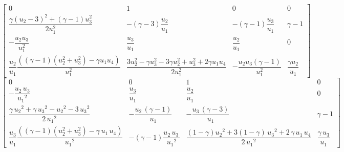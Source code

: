 \documentclass{article}
\numberwithin{equation}{subsection}    %
\begin{document}
\begin{appendix}
    \begin{equation}
        \begin{bmatrix}
            0                                                                                                & 1                                                                                                   & 0                                         & 0                           \\
            \dfrac{\gamma (u_{2}-3)^{2}+(\gamma-1) u_{3}^{2}}{2 u_{1}^{2}}                                   & -(\gamma-3)\dfrac{u_{2}}{u_{1}}                                                                     & -(\gamma-1)\dfrac{u_{3}}{u_{1}}           & \gamma-1                    \\
            -\dfrac{u_{2} u_{3}}{u_{1}^{2}}                                                                  & \dfrac{u_{3}}{u_{1}}                                                                                & \dfrac{u_{2}}{u_{1}}                      & 0                           \\
            \dfrac{u_{2}}{u_1}\dfrac{\left((\gamma-1)(u_{2}^{2}+u_3^2)-\gamma u_{1} u_{4}\right)}{u_{1}^{2}} & \dfrac{3 u_{2}^{2}-\gamma u_{3}^{2}-3 \gamma u_{2}^{2}+u_{3}^{2}+2 \gamma u_{1} u_{4}}{2 u_{1}^{2}} & -\dfrac{u_{2} u_{3}(\gamma-1)}{u_{1}^{2}} & \dfrac{\gamma u_{2}}{u_{1}}
        \end{bmatrix}
    \end{equation}
    \begin{equation}
        \begin{bmatrix}
            0                                                                                             & 0                                                        & 1                                                                                       & 0                           \\
            -\dfrac{u_2 \,u_3 }{{u_1 }^2 }                                                                & \dfrac{u_3 }{u_1 }                                       & \dfrac{u_2 }{u_1 }                                                                      & 0                           \\
            \dfrac{\gamma \,{u_2 }^2 +\gamma \,{u_3 }^2 -{u_2 }^2 -3\,{u_3 }^2 }{2\,{u_1 }^2 }            & -\dfrac{u_2 \,{\left(\gamma -1\right)}}{u_1 }            & -\dfrac{u_3 \,{\left(\gamma -3\right)}}{u_1 }                                           & \gamma -1                   \\
            \dfrac{u_3}{u_1}\dfrac{{\left((\gamma-1)(u_2^2+u_3^2)-\gamma \,u_1 \,u_4 \right)}}{{u_1 }^2 } & -{\left(\gamma -1\right)}\dfrac{u_2 \,u_3 \,}{{u_1 }^2 } & \dfrac{(1-\gamma){u_2 }^2 +3(1-\gamma)\,{u_3 }^2 +2\,\gamma \,u_1 \,u_4 }{2\,{u_1 }^2 } & \dfrac{\gamma \,u_3 }{u_1 }
        \end{bmatrix}
    \end{equation}


\end{appendix}
\end{document}
